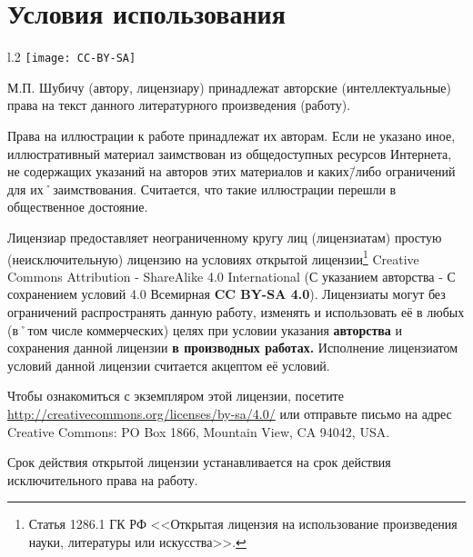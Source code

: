 ﻿%
\chapter{Условия использования}

\begin{wrapfigure}{l}{.2\textwidth}
\centering
\texttt{[image: CC-BY-SA]}
\label{fig:CC-BY-SA}
\end{wrapfigure}

\noindent М.П. Шубичу (автору, лицензиару) принадлежат авторские (интеллектуальные) права на текст данного литературного произведения (работу). 

\noindent Права на иллюстрации к работе принадлежат их авторам. Если не указано иное, иллюстративный материал заимствован из общедоступных ресурсов Интернета, не содержащих указаний на авторов этих материалов и каких\=/либо ограничений для их˚заимствования. Считается, что такие иллюстрации перешли в общественное достояние.

Лицензиар предоставляет неограниченному кругу лиц (лицензиатам) простую (неисключительную) лицензию на условиях открытой лицензии\footnote
{Статья 1286.1 ГК РФ <<Открытая лицензия на использование произведения науки, литературы или искусства>>.}
Creative Commons Attribution - ShareAlike 4.0 International (С указанием авторства - С сохранением условий 4.0 Всемирная \textbf{CC BY-SA 4.0}). Лицензиаты могут без ограничений распространять данную работу, изменять и использовать её в любых (в˚том числе коммерческих) целях при условии указания \textbf{авторства} и сохранения данной лицензии \textbf{в производных работах.}
Исполнение лицензиатом условий данной лицензии считается акцептом её условий.

Чтобы ознакомиться с экземпляром этой лицензии, посетите \url{http://creativecommons.org/licenses/by-sa/4.0/} или отправьте письмо на адрес Creative Commons: PO Box 1866, Mountain View, CA 94042, USA.{\sloppy

}%

Срок действия открытой лицензии устанавливается на срок действия исключительного права на работу.